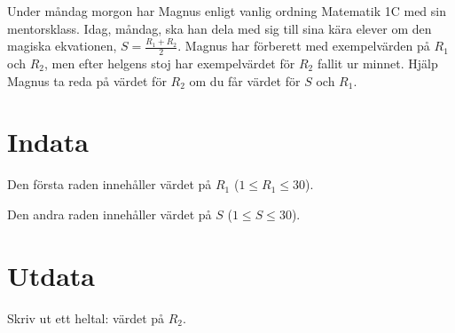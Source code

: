 Under måndag morgon har Magnus enligt vanlig ordning Matematik 1C med sin mentorsklass.
Idag, måndag, ska han dela med sig till sina kära elever om den magiska ekvationen,
$S=\frac{R_1+R_2}{2}$. Magnus har förberett med exempelvärden på $R_1$ och $R_2$, men
efter helgens stoj har exempelvärdet för $R_2$ fallit ur minnet. Hjälp Magnus ta reda
på värdet för $R_2$ om du får värdet för $S$ och $R_1$.

\section*{Indata}
Den första raden innehåller värdet på $R_1$ ($1 \leq R_1 \leq 30$).

Den andra raden innehåller värdet på $S$ ($1 \leq S \leq 30$).

\section*{Utdata}
Skriv ut ett heltal: värdet på $R_2$.

